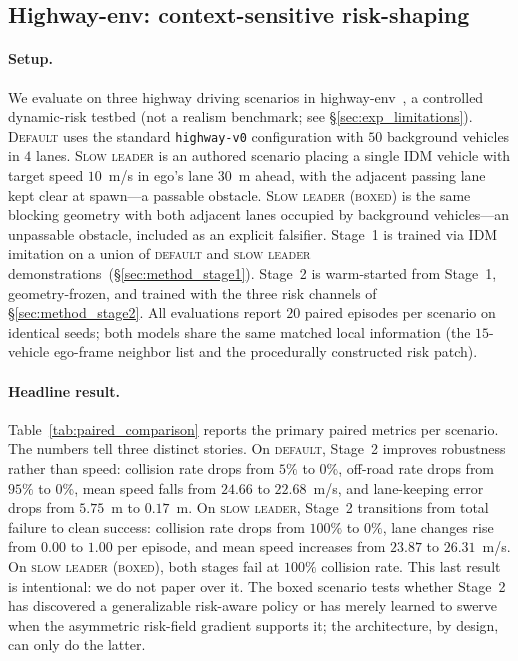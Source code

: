 \subsection{Highway-env: context-sensitive risk-shaping}
\label{sec:exp_highway}

\paragraph{Setup.}
We evaluate on three highway driving scenarios in highway-env~\citep{highway-env}, a controlled dynamic-risk testbed (not a realism benchmark; see \S\ref{sec:exp_limitations}).
\textsc{Default} uses the standard \texttt{highway-v0} configuration with $50$ background vehicles in $4$ lanes.
\textsc{Slow leader} is an authored scenario placing a single IDM vehicle with target speed $10$~m/s in ego's lane $30$~m ahead, with the adjacent passing lane kept clear at spawn---a passable obstacle.
\textsc{Slow leader (boxed)} is the same blocking geometry with both adjacent lanes occupied by background vehicles---an unpassable obstacle, included as an explicit falsifier.
Stage~1 is trained via IDM imitation on a union of \textsc{default} and \textsc{slow leader} demonstrations~(\S\ref{sec:method_stage1}).
Stage~2 is warm-started from Stage~1, geometry-frozen, and trained with the three risk channels of \S\ref{sec:method_stage2}.
All evaluations report $20$ paired episodes per scenario on identical seeds; both models share the same matched local information (the $15$-vehicle ego-frame neighbor list and the procedurally constructed risk patch).

\paragraph{Headline result.}
Table~\ref{tab:paired_comparison} reports the primary paired metrics per scenario.
The numbers tell three distinct stories.
On \textsc{default}, Stage~2 improves robustness rather than speed: collision rate drops from $5\%$ to $0\%$, off-road rate drops from $95\%$ to $0\%$, mean speed falls from $24.66$ to $22.68$~m/s, and lane-keeping error drops from $5.75$~m to $0.17$~m.
On \textsc{slow leader}, Stage~2 transitions from total failure to clean success: collision rate drops from $100\%$ to $0\%$, lane changes rise from $0.00$ to $1.00$ per episode, and mean speed increases from $23.87$ to $26.31$~m/s.
On \textsc{slow leader (boxed)}, both stages fail at $100\%$ collision rate.
This last result is intentional: we do not paper over it.
The boxed scenario tests whether Stage~2 has discovered a generalizable risk-aware policy or has merely learned to swerve when the asymmetric risk-field gradient supports it; the architecture, by design, can only do the latter.

